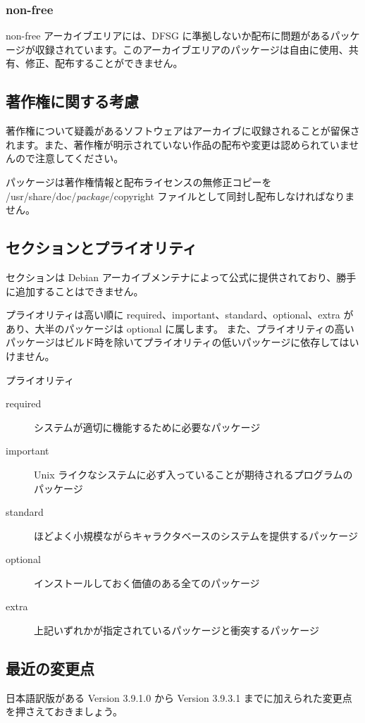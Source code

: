 \documentclass[mingoth,a4paper]{jsarticle}
\begin{document}
\subsubsection{non-free}
non-free アーカイブエリアには、DFSG に準拠しないか配布に問題があるパッケージが収録されています。このアーカイブエリアのパッケージは自由に使用、共有、修正、配布することができません。

\subsection{著作権に関する考慮}
著作権について疑義があるソフトウェアはアーカイブに収録されることが留保されます。また、著作権が明示されていない作品の配布や変更は{\large 認められていません}ので注意してください。

パッケージは著作権情報と配布ライセンスの無修正コピーを /usr/share/doc/{\it package}/copyright ファイルとして同封し配布しなければなりません。


\subsection{セクションとプライオリティ}
セクションは Debian アーカイブメンテナによって公式に提供されており、勝手に追加することはできません。

プライオリティは高い順に required、important、standard、optional、extra があり、大半のパッケージは optional に属します。
また、プライオリティの高いパッケージはビルド時を除いてプライオリティの低いパッケージに依存してはいけません。

\begin{itembox}[l]{プライオリティ}
\begin{description}
\item [required] システムが適切に機能するために必要なパッケージ
\item [important] Unix ライクなシステムに必ず入っていることが期待されるプログラムのパッケージ
\item [standard] ほどよく小規模ながらキャラクタベースのシステムを提供するパッケージ
\item [optional] インストールしておく価値のある全てのパッケージ
\item [extra] 上記いずれかが指定されているパッケージと衝突するパッケージ
\end{description}
\end{itembox}


\subsection{最近の変更点}
日本語訳版がある Version 3.9.1.0 から Version 3.9.3.1 までに加えられた変更点を押さえておきましょう。
\end{document}
